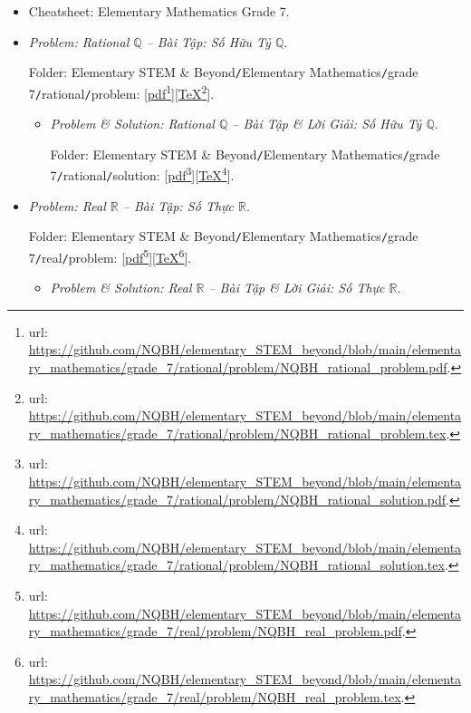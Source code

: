 \documentclass[12pt]{article}
\begin{document}
\begin{itemize}
	\item Cheatsheet: Elementary Mathematics Grade 7.
	\item {\it Problem: Rational $\mathbb{Q}$ -- Bài Tập: Số Hữu Tỷ $\mathbb{Q}$}.
	
	Folder: {\sf Elementary STEM \& Beyond{\tt/}Elementary Mathematics{\tt/}grade 7{\tt/}rational{\tt/}problem}: [\href{https://github.com/NQBH/elementary_STEM_beyond/blob/main/elementary_mathematics/grade_7/rational/problem/NQBH_rational_problem.pdf}{pdf}\footnote{{\sc url}: \url{https://github.com/NQBH/elementary_STEM_beyond/blob/main/elementary_mathematics/grade_7/rational/problem/NQBH_rational_problem.pdf}.}][\href{https://github.com/NQBH/elementary_STEM_beyond/blob/main/elementary_mathematics/grade_7/rational/problem/NQBH_rational_problem.tex}{\TeX}\footnote{{\sc url}: \url{https://github.com/NQBH/elementary_STEM_beyond/blob/main/elementary_mathematics/grade_7/rational/problem/NQBH_rational_problem.tex}.}].
	\begin{itemize}
		\item {\it Problem \& Solution: Rational $\mathbb{Q}$ -- Bài Tập \& Lời Giải: Số Hữu Tỷ $\mathbb{Q}$}.
		
		Folder: {\sf Elementary STEM \& Beyond{\tt/}Elementary Mathematics{\tt/}grade 7{\tt/}rational{\tt/}solution}: [\href{https://github.com/NQBH/elementary_STEM_beyond/blob/main/elementary_mathematics/grade_7/rational/problem/NQBH_rational_solution.pdf}{pdf}\footnote{{\sc url}: \url{https://github.com/NQBH/elementary_STEM_beyond/blob/main/elementary_mathematics/grade_7/rational/problem/NQBH_rational_solution.pdf}.}][\href{https://github.com/NQBH/elementary_STEM_beyond/blob/main/elementary_mathematics/grade_7/rational/problem/NQBH_rational_solution.tex}{\TeX}\footnote{{\sc url}: \url{https://github.com/NQBH/elementary_STEM_beyond/blob/main/elementary_mathematics/grade_7/rational/problem/NQBH_rational_solution.tex}.}].
	\end{itemize}
	\item {\it Problem: Real $\mathbb{R}$ -- Bài Tập: Số Thực $\mathbb{R}$}.
	
	Folder: {\sf Elementary STEM \& Beyond{\tt/}Elementary Mathematics{\tt/}grade 7{\tt/}real{\tt/}problem}: [\href{https://github.com/NQBH/elementary_STEM_beyond/blob/main/elementary_mathematics/grade_7/real/problem/NQBH_real_problem.pdf}{pdf}\footnote{{\sc url}: \url{https://github.com/NQBH/elementary_STEM_beyond/blob/main/elementary_mathematics/grade_7/real/problem/NQBH_real_problem.pdf}.}][\href{https://github.com/NQBH/elementary_STEM_beyond/blob/main/elementary_mathematics/grade_7/real/problem/NQBH_real_problem.tex}{\TeX}\footnote{{\sc url}: \url{https://github.com/NQBH/elementary_STEM_beyond/blob/main/elementary_mathematics/grade_7/real/problem/NQBH_real_problem.tex}.}].
	\begin{itemize}
		\item {\it Problem \& Solution: Real $\mathbb{R}$ -- Bài Tập \& Lời Giải: Số Thực $\mathbb{R}$}.
		

\end{itemize}
\end{itemize}
\end{document}
